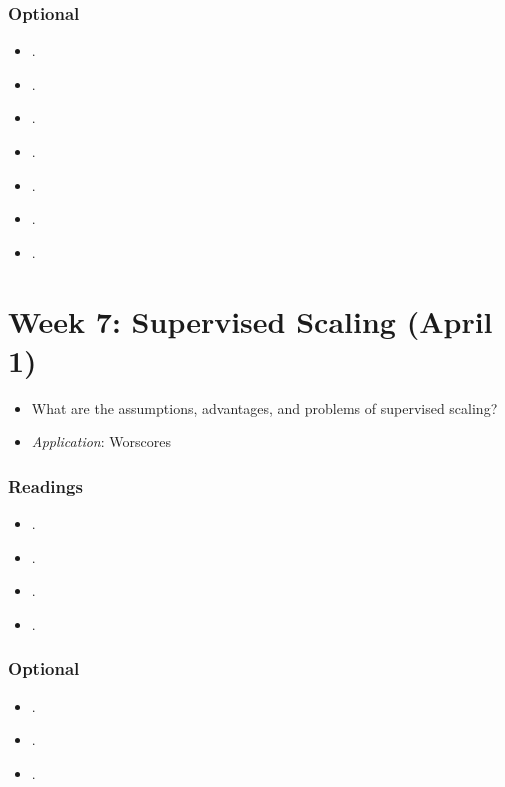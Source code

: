 \documentclass[abstract=on,parskip=full,headings=standardclasses,fontsize=11pt,paper=a4]{scrartcl}
\begin{document}
\subsubsection*{Optional}
\begin{itemize}
\item {}.
\item {}.
\item {}.
\item {}.
\item {}.
\item {}.
\item {}.
\end{itemize}

 
\section{Week 7:  Supervised Scaling (April 1)}

\begin{itemize}
\renewcommand\labelitemi{--}
\item What are the assumptions, advantages, and problems of supervised scaling?
\item \textit{Application}: Worscores
\end{itemize}

\subsubsection*{Readings}
\begin{itemize}
\item {}.
\item {}.
\item {}.
\item {}.
\end{itemize}

\subsubsection*{Optional}
\begin{itemize}
\item {}.
\item {}.
\item {}.
\end{itemize}
\end{document}
